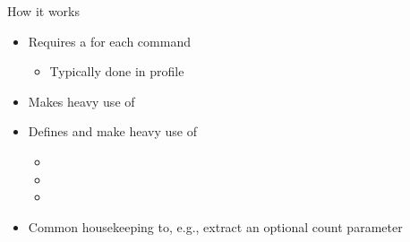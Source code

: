 \documentclass[11pt]{beamer}
\begin{document}
\begin{frame}{How it works}
\begin{itemize}
\item Requires a  for each command
  \begin{itemize}
  \item Typically done in profile
  \end{itemize}
\item Makes heavy use of 
\item Defines and make heavy use of
  \begin{itemize}
  \item {}
  \item {}
  \item {}
  \end{itemize}
\item Common housekeeping to, e.g., extract an optional count parameter
\end{itemize}
\end{frame}
\end{document}
